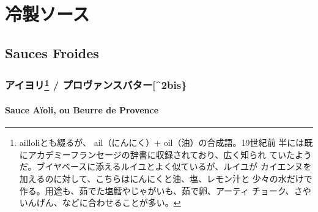 \hypertarget{ux51b7ux88fdux30bdux30fcux30b9}{%
\section{冷製ソース}\label{ux51b7ux88fdux30bdux30fcux30b9}}

\hypertarget{sauces-froides}{%
\subsection{Sauces Froides}\label{sauces-froides}}

\begin{recette}
\hypertarget{ux30a2ux30a4ux30e8ux30ea2-ux30d7ux30edux30f4ux30a1ux30f3ux30b9ux30d0ux30bfux30fc2bis}{%
\subsubsection[アイヨリ /
プロヴァンスバター{[}\^{}2bis\}]{\texorpdfstring{アイヨリ\footnote{ailloliとも綴るが、
  ail（にんにく）+ oil（油）の合成語。19世紀前
  半には既にアカデミーフランセージの辞書に収録されており、広く知られ
  ていたようだ。ブイヤベースに添えるルイユとよく似ているが、ルイユが
  カイエンヌを加えるのに対して、こちらはにんにくと油、塩、レモン汁と
  少々の水だけで作る。用途も、茹でた塩鱈やじゃがいも、茹で卵、アーティ
  チョーク、さやいんげん、などに合わせることが多い。} /
プロヴァンスバター{[}\^{}2bis\}}{アイヨリ / プロヴァンスバター{[}\^{}2bis\}}}\label{ux30a2ux30a4ux30e8ux30ea2-ux30d7ux30edux30f4ux30a1ux30f3ux30b9ux30d0ux30bfux30fc2bis}}

\hypertarget{sauce-aioli}{%
\paragraph{Sauce Aïoli, ou Beurre de Provence}\label{sauce-aioli}}



\end{recette}
